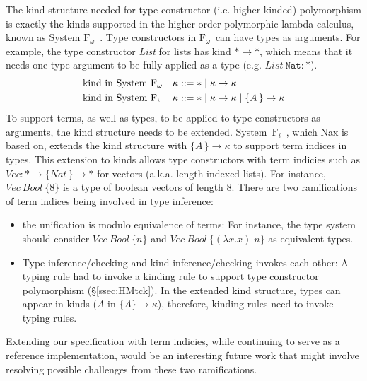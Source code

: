 \documentclass[runningheads,a4paper]{llncs}
\newcommand{\Fw}{\ensuremath{\mathrm{F}_\omega}}
\newcommand{\Fi}{\ensuremath{\mathrm{F}_i}}
\begin{document}
The kind structure needed for type constructor (i.e. higher-kinded) polymorphism is exactly
the kinds supported in the higher-order polymorphic lambda calculus,
known as System \Fw\ \cite{girard72thesis}. Type constructors in \Fw\ can have
types as arguments. For example, the type constructor \textit{List}
for lists has kind $* \to *$, which means that it needs one type argument
to be fully applied as a type (e.g. $\textit{List}~\texttt{Nat} : *$).
\begin{align*}
  &\text{kind in System \Fw}  &&\kappa ::= * \mid \kappa \to \kappa \\
  &\text{kind in System \Fi}  &&\kappa ::= * \mid \kappa \to \kappa
                                             \mid \{A\,\}\to \kappa
\end{align*}
To support terms, as well as types, to be applied to type constructors
as arguments, the kind structure needs to be extended.
System~\Fi\ \cite{AhnSheFioPit13}, which Nax is based on, extends
the kind structure
with $\{A\,\}\to \kappa$ to support term indices in types.
This extension to kinds allows type constructors with term indicies
such as $\textit{Vec} : * \to \{\textit{Nat}\,\} \to *$ for vectors
(a.k.a. length indexed lists). For instance,
$\textit{Vec}~\textit{Bool}~\{8\}$ is a type of boolean vectors of length 8.
There are two ramifications of term indices being involved in type inference:
\begin{itemize}\vspace*{-.75ex}
\item the unification is modulo equivalence of terms: For instance,
  the type system should consider $\textit{Vec}~\textit{Bool}~\{n\}$ and
  $\textit{Vec}~\textit{Bool}~\{(\lambda x.x)\;n\}$ as equivalent types.
  \vspace*{.5ex}
\item Type inference/checking and kind inference/checking invokes each other:
  A typing rule had to invoke a kinding rule to support
  type constructor polymorphism  (\S\ref{ssec:HMtck}).
  In the extended kind structure, types can appear in kinds
  ($A$ in $\{\!A\}\to\kappa$), therefore, kinding rules
  need to invoke typing rules.
\end{itemize}
Extending our specification with term indicies, while continuing to serve
as a reference implementation, would be an interesting future work that
might involve resolving possible challenges from these two ramifications.


\end{document}
